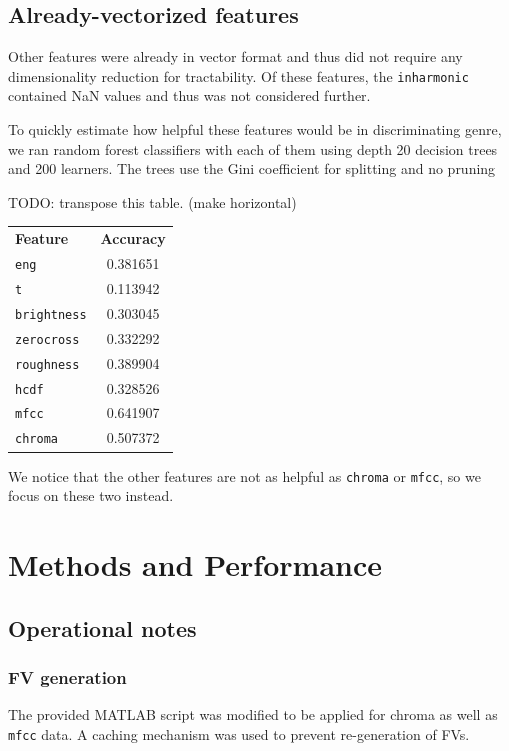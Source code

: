 \documentclass{article}
\begin{document}
\subsection{Already-vectorized features}

Other features were already in vector format and thus did not require any dimensionality reduction for tractability. Of these features, the \texttt{inharmonic} contained NaN values and thus was not considered further.

To quickly estimate how helpful these features would be in discriminating genre,
we ran random forest classifiers with each of them using depth 20 decision trees and 200 learners. The trees use the Gini coefficient for splitting and no pruning

TODO: transpose this table. (make horizontal)
\begin{center}
\begin{tabular}{l|c}
    {\bf Feature}   &   {\bf Accuracy} \\
\texttt{eng} & 0.381651 \\
\texttt{t} & 0.113942 \\
\texttt{brightness} & 0.303045 \\
\texttt{zerocross} & 0.332292 \\
\texttt{roughness} & 0.389904 \\
\texttt{hcdf} & 0.328526 \\
\texttt{mfcc} & 0.641907 \\
\texttt{chroma} & 0.507372 \\
\end{tabular}
\end{center}

We notice that the other features are not as helpful as \texttt{chroma} or \texttt{mfcc}, so we focus on these two instead.

\section{Methods and Performance}

\subsection{Operational notes}

\subsubsection{FV generation}

The provided MATLAB script was modified to be applied for chroma as well as \texttt{mfcc} data. A caching mechanism was used to prevent re-generation of FVs.
\end{document}
